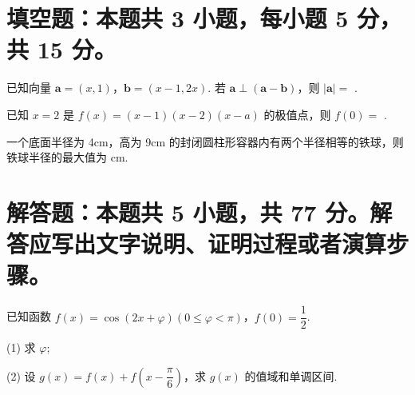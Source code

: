 \documentclass{exam-zh}
\begin{document}
\section{填空题：本题共 3 小题，每小题 5 分，共 15 分。}


\begin{question}
已知向量 $\mathbf{a}=(x,1)$，$\mathbf{b}=(x-1, 2x)$. 若 $\mathbf{a} \perp (\mathbf{a}-\mathbf{b})$，则 $|\mathbf{a}|=$ \underline{\hspace{4em}}.
\end{question}


\begin{question}
已知 $x=2$ 是 $f(x)=(x-1)(x-2)(x-a)$ 的极值点，则 $f(0)=$ \underline{\hspace{4em}}.
\end{question}


\begin{question}
一个底面半径为 4cm，高为 9cm 的封闭圆柱形容器内有两个半径相等的铁球，则铁球半径的最大值为 \underline{\hspace{4em}} cm.
\end{question}

\section{解答题：本题共 5 小题，共 77 分。解答应写出文字说明、证明过程或者演算步骤。}


\begin{problem}[points = 13]
已知函数 $f(x)=\cos(2x+\varphi) (0 \leqslant \varphi < \pi)$，$f(0)=\dfrac{1}{2}$.

(1) 求 $\varphi$;

(2) 设 $g(x)=f(x)+f\left(x-\dfrac{\pi}{6}\right)$，求 $g(x)$ 的值域和单调区间.
\end{problem}

\end{document}
